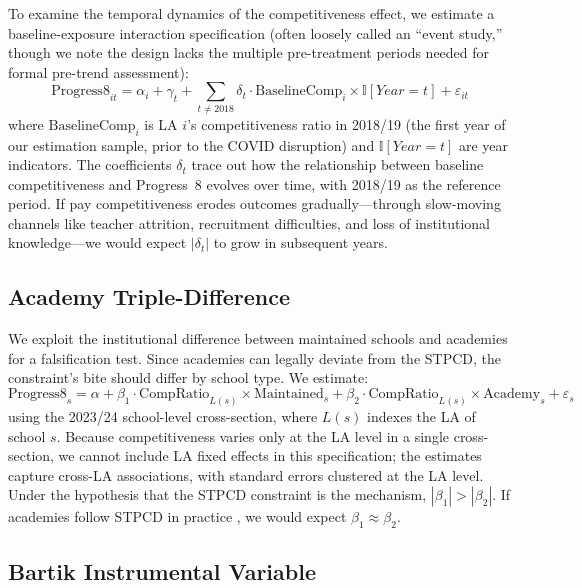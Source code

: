 \documentclass[12pt]{article}
\newcommand{\ind}{\mathbb{I}}
\begin{document}
To examine the temporal dynamics of the competitiveness effect, we estimate a baseline-exposure interaction specification (often loosely called an ``event study,'' though we note the design lacks the multiple pre-treatment periods needed for formal pre-trend assessment):
\begin{equation}
\label{eq:event}
\text{Progress8}_{it} = \alpha_i + \gamma_t + \sum_{t \neq 2018} \delta_t \cdot \text{BaselineComp}_i \times \ind[Year = t] + \varepsilon_{it}
\end{equation}
where $\text{BaselineComp}_i$ is LA $i$'s competitiveness ratio in 2018/19 (the first year of our estimation sample, prior to the COVID disruption) and $\ind[Year = t]$ are year indicators. The coefficients $\delta_t$ trace out how the relationship between baseline competitiveness and Progress~8 evolves over time, with 2018/19 as the reference period. If pay competitiveness erodes outcomes gradually---through slow-moving channels like teacher attrition, recruitment difficulties, and loss of institutional knowledge---we would expect $|\delta_t|$ to grow in subsequent years.

\subsection{Academy Triple-Difference}

We exploit the institutional difference between maintained schools and academies for a falsification test. Since academies can legally deviate from the STPCD, the constraint's bite should differ by school type. We estimate:
\begin{equation}
\label{eq:ddd}
\text{Progress8}_{s} = \alpha + \beta_1 \cdot \text{CompRatio}_{L(s)} \times \text{Maintained}_s + \beta_2 \cdot \text{CompRatio}_{L(s)} \times \text{Academy}_s + \varepsilon_s
\end{equation}
using the 2023/24 school-level cross-section, where $L(s)$ indexes the LA of school $s$. Because competitiveness varies only at the LA level in a single cross-section, we cannot include LA fixed effects in this specification; the estimates capture cross-LA associations, with standard errors clustered at the LA level. Under the hypothesis that the STPCD constraint is the mechanism, $|\beta_1| > |\beta_2|$. If academies follow STPCD in practice \citep{britton2016teacher}, we would expect $\beta_1 \approx \beta_2$.

\subsection{Bartik Instrumental Variable}
\end{document}
